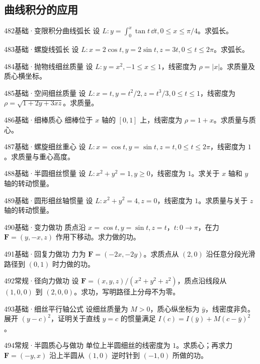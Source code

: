 \subsection{曲线积分的应用}
\begin{exercise}{482}{基础·变限积分曲线弧长}
设 $L:y=\int_0^x\tan t\,\dd t,0\leq x\leq\pi/4$。求弧长。
\end{exercise}
\begin{exercise}{483}{基础·螺旋线弧长}
设 $L:x=2\cos t,y=2\sin t,z=3t,0\leq t\leq2\pi$。求弧长。
\end{exercise}
\begin{exercise}{484}{基础·抛物线细丝质量}
设 $L:y=x^2,-1\leq x\leq1$，线密度为 $\rho=|x|$。求质量及质心横坐标。
\end{exercise}
\begin{exercise}{485}{基础·空间细丝质量}
设 $L:x=t,y=t^2/2,z=t^3/3,0\leq t\leq1$，线密度为 $\rho=\sqrt{1+2y+3xz}$。求质量。
\end{exercise}
\begin{exercise}{486}{基础·细棒质心}
细棒位于 $x$ 轴的 $[0,1]$ 上，线密度为 $\rho=1+x$。求质量与质心。
\end{exercise}
\begin{exercise}{487}{基础·螺旋细丝重心}
设 $L:x=\cos t,y=\sin t,z=t,0\leq t\leq2\pi$，线密度为 $1$。求质量与重心高度。
\end{exercise}
\begin{exercise}{488}{基础·半圆细丝惯量}
设 $L:x^2+y^2=1,y\geq0$，线密度为 $1$。求关于 $x$ 轴和 $y$ 轴的转动惯量。
\end{exercise}
\begin{exercise}{489}{基础·圆形细丝轴惯量}
设 $L:x^2+y^2=4,z=0$，线密度为 $1$。求质量与关于 $z$ 轴的转动惯量。
\end{exercise}
\begin{exercise}{490}{基础·变力做功}
质点沿 $x=\cos t,y=\sin t,z=t$，$t:0\to\pi$，在力 $\bm F=(y,-x,z)$ 作用下移动。求力做的功。
\end{exercise}
\begin{exercise}{491}{基础·回复力做功}
力为 $\bm F=(-2x,-2y)$。求质点从 $(2,0)$ 沿任意分段光滑路径到 $(0,1)$ 时力做的功。
\end{exercise}
\begin{exercise}{492}{常规·径向力做功}
设 $\bm F=(x,y,z)/(x^2+y^2+z^2)$，质点沿线段从 $(1,0,0)$ 到 $(2,0,0)$。求功，写明路径上分母不为零。
\end{exercise}
\begin{exercise}{493}{基础·细丝平行轴公式}
设细丝质量为 $M>0$，质心纵坐标为 $\bar y$，线密度非负。展开 $(y-c)^2$，证明关于直线 $y=c$ 的惯量满足 $I(c)=I(\bar y)+M(c-\bar y)^2$。
\end{exercise}
\begin{exercise}{494}{常规·半圆质心与做功}
单位上半圆细丝的线密度为 $1$。求质心；再求力 $\bm F=(-y,x)$ 沿上半圆从 $(1,0)$ 逆时针到 $(-1,0)$ 所做的功。
\end{exercise}
